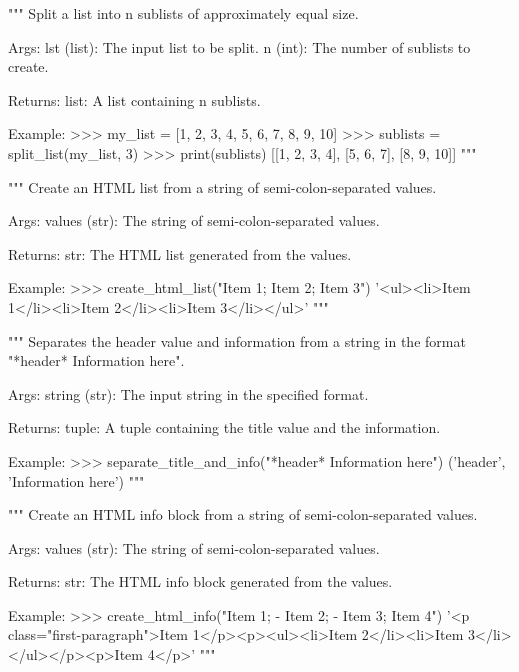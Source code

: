 \begin{codebox}
"""
Split a list into n sublists of approximately equal size.

Args:
    lst (list): The input list to be split.
    n (int): The number of sublists to create.

Returns:
    list: A list containing n sublists.

Example:
    >>> my_list = [1, 2, 3, 4, 5, 6, 7, 8, 9, 10]
    >>> sublists = split_list(my_list, 3)
    >>> print(sublists)
    [[1, 2, 3, 4], [5, 6, 7], [8, 9, 10]]
"""
\end{codebox}

\begin{codebox}
"""
Create an HTML list from a string of semi-colon-separated values.

Args:
    values (str): The string of semi-colon-separated values.

Returns:
    str: The HTML list generated from the values.

Example:
    >>> create_html_list("Item 1; Item 2; Item 3")
    '<ul>\n<li>Item 1</li>\n<li>Item 2</li>\n<li>Item 3</li>\n</ul>'
"""
\end{codebox}

\begin{codebox}
"""
Separates the header value and information from a string in the format "*header* Information here".

Args:
    string (str): The input string in the specified format.

Returns:
    tuple: A tuple containing the title value and the information.

Example:
    >>> separate_title_and_info("*header* Information here")
    ('header', 'Information here')
"""
\end{codebox}

\begin{codebox}
"""
Create an HTML info block from a string of semi-colon-separated values.

Args:
    values (str): The string of semi-colon-separated values.

Returns:
    str: The HTML info block generated from the values.

Example:
    >>> create_html_info("Item 1; - Item 2; - Item 3; Item 4")
    '<p class="first-paragraph">Item 1</p>\n<p><ul><li>Item 2</li>\n<li>Item 3</li>\n</ul></p>\n<p>Item 4</p>\n'
"""
\end{codebox}

